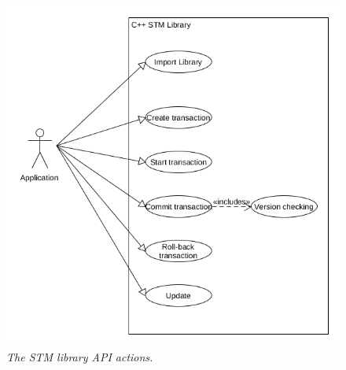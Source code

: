 \documentclass[12pt]{article}
\begin{document}
\begin{figure}[h!]
\centering
\includegraphics[scale=0.35]{Pictures/usacase.png}
\caption{\textit{\color{gray}The STM library API actions.}}
\end{figure}
\end{document}
